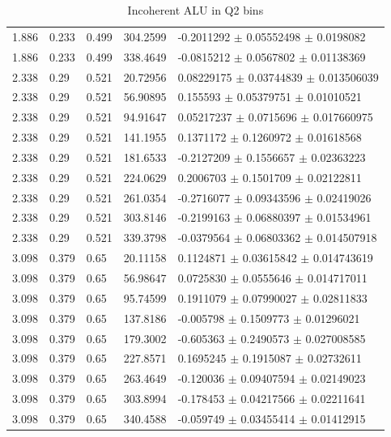 \begin{table}[!h]
\begin{center}
\begin{tabular}{||l|l|l|l|l||}
  1.886 & 0.233 & 0.499 &    304.2599  &  -0.2011292 $\pm$  0.05552498  $\pm$  0.0198082       \\
  1.886 & 0.233 & 0.499 &    338.4649  &  -0.0815212 $\pm$  0.0567802   $\pm$  0.01138369      \\
 \hline                                                                      
  2.338 & 0.29 & 0.521  &    20.72956  &  0.08229175 $\pm$  0.03744839  $\pm$  0.013506039    \\ 
  2.338 & 0.29 & 0.521  &    56.90895  &  0.155593   $\pm$  0.05379751  $\pm$  0.01010521     \\ 
  2.338 & 0.29 & 0.521  &    94.91647  &  0.05217237 $\pm$  0.0715696   $\pm$  0.017660975    \\ 
  2.338 & 0.29 & 0.521  &    141.1955  &  0.1371172  $\pm$  0.1260972   $\pm$  0.01618568     \\ 
  2.338 & 0.29 & 0.521  &    181.6533  &  -0.2127209 $\pm$  0.1556657   $\pm$  0.02363223     \\ 
  2.338 & 0.29 & 0.521  &    224.0629  &  0.2006703  $\pm$  0.1501709   $\pm$  0.02122811     \\ 
  2.338 & 0.29 & 0.521  &    261.0354  &  -0.2716077 $\pm$  0.09343596  $\pm$  0.02419026     \\ 
  2.338 & 0.29 & 0.521  &    303.8146  &  -0.2199163 $\pm$  0.06880397  $\pm$  0.01534961     \\ 
  2.338 & 0.29 & 0.521  &    339.3798  &  -0.0379564 $\pm$  0.06803362  $\pm$  0.014507918    \\ 
 \hline                                                                      
  3.098 &0.379 & 0.65  &     20.11158  &  0.1124871  $\pm$  0.03615842  $\pm$  0.014743619    \\ 
  3.098 &0.379 & 0.65  &     56.98647  &  0.0725830  $\pm$  0.0555646   $\pm$  0.014717011    \\ 
  3.098 &0.379 & 0.65  &     95.74599  &  0.1911079  $\pm$  0.07990027  $\pm$  0.02811833     \\ 
  3.098 &0.379 & 0.65  &     137.8186  &  -0.005798  $\pm$  0.1509773   $\pm$  0.01296021     \\ 
  3.098 &0.379 & 0.65  &     179.3002  &  -0.605363  $\pm$  0.2490573   $\pm$  0.027008585    \\ 
  3.098 &0.379 & 0.65  &     227.8571  &  0.1695245  $\pm$  0.1915087   $\pm$  0.02732611     \\ 
  3.098 &0.379 & 0.65  &     263.4649  &  -0.120036  $\pm$  0.09407594  $\pm$  0.02149023     \\ 
  3.098 &0.379 & 0.65  &     303.8994  &  -0.178453  $\pm$  0.04217566  $\pm$  0.02211641     \\ 
  3.098 &0.379 & 0.65  &     340.4588  &  -0.059749  $\pm$  0.03455414  $\pm$  0.01412915     \\ 
 \hline
 \hline
      \end{tabular}
      \caption{Incoherent ALU in Q2 bins}
      \label{table:InCoh_Q2_BSA}
   \end{center}
\end{table}


